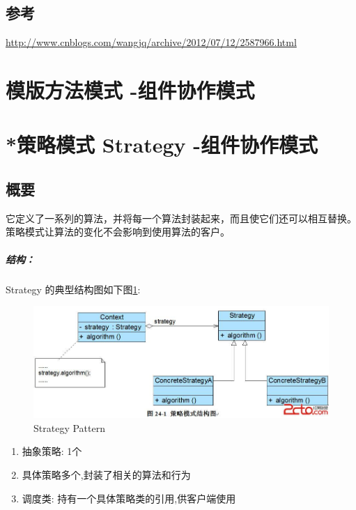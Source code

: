 \documentclass[UTF8,a4paper,12pt]{ctexbook}
\begin{document}
		\subsection{参考}
			\url{http://www.cnblogs.com/wangjq/archive/2012/07/12/2587966.html}
			
\newpage
\section{模版方法模式 -组件协作模式}

\newpage
\section{*策略模式 Strategy -组件协作模式}
	\subsection{概要}它定义了一系列的算法，并将每一个算法封装起来，而且使它们还可以相互替换。策略模式让算法的变化不会影响到使用算法的客户。
	
	\subparagraph{结构：}Strategy 的典型结构图如下图\ref{Strategy}:
	\begin{figure}[h]
		\centering
		\includegraphics[scale= 0.7]{Strategy.jpg}
		\caption{Strategy Pattern}
		\label{Strategy}
	\end{figure}
	
		\begin{enumerate}[itemindent = 1em]
			\item 抽象策略: 1个
			\item 具体策略多个,封装了相关的算法和行为
			\item 调度类: 持有一个具体策略类的引用,供客户端使用
		\end{enumerate}
		
\end{document}
